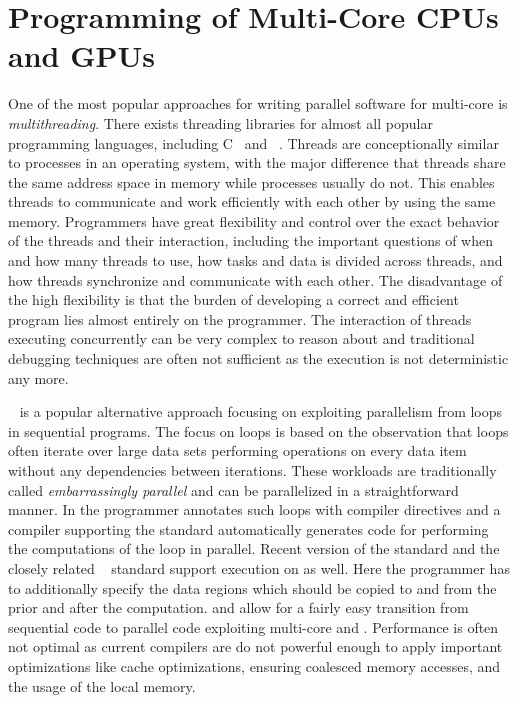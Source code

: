 \section{Programming of Multi-Core CPUs and GPUs}
One of the most popular approaches for writing parallel software for multi-core \CPUs is \emph{multithreading}.
There exists threading libraries for almost all popular programming languages, including C~\cite{} and \Cpp~\cite{}.
Threads are conceptionally similar to processes in an operating system, with the major difference that threads share the same address space in memory while processes usually do not.
This enables threads to communicate and work efficiently with each other by using the same memory.
Programmers have great flexibility and control over the exact behavior of the threads and their interaction, including the important questions of when and how many threads to use, how tasks and data is divided across threads, and how threads synchronize and communicate with each other.
The disadvantage of the high flexibility is that the burden of developing a correct and efficient program lies almost entirely on the programmer.
The interaction of threads executing concurrently can be very complex to reason about and traditional debugging techniques are often not sufficient as the execution is not deterministic any more.

\OpenMP~\cite{} is a popular alternative approach focusing on exploiting parallelism from loops in sequential programs.
The focus on loops is based on the observation that loops often iterate over large data sets performing operations on every data item without any dependencies between iterations.
These workloads are traditionally called \emph{embarrassingly parallel} and can be parallelized in a straightforward manner.
In \OpenMP the programmer annotates such loops with compiler directives and a compiler supporting the \OpenMP standard automatically generates code for performing the computations of the loop in parallel.
Recent version of the \OpenMP standard and the closely related \OpenACC~\cite{} standard support execution on \GPUs as well.
Here the programmer has to additionally specify the data regions which should be copied to and from the \GPU prior and after the computation.
\OpenMP and \OpenACC allow for a fairly easy transition from sequential code to parallel code exploiting multi-core \CPUs and \GPUs.
Performance is often not optimal as  current compilers are do not powerful enough to apply important optimizations like cache optimizations, ensuring coalesced memory accesses, and the usage of the local memory.

